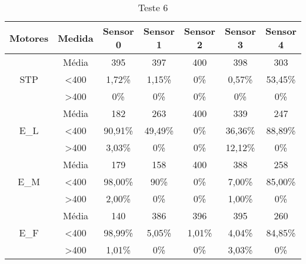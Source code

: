 \begin{table}[]
\centering
\caption{Teste 6}
\label{teste_6}
\begin{tabular}{|c|c|ccccc|}
\hline
\textbf{Motores}                & \textbf{Medida}  & \textbf{Sensor 0} & \textbf{Sensor 1} & \textbf{Sensor 2} & \textbf{Sensor 3} & \textbf{Sensor 4} \\ \hline
\multirow{3}{*}{STP}            & Média            & 395               & 397               & 400               & 398               & 303               \\
                                & \textless 400    & 1,72\%            & 1,15\%            & 0\%            & 0,57\%            & 53,45\%           \\
                                & \textgreater 400 & 0\%            & 0\%            & 0\%            & 0\%            & 0\%            \\ \hline
\multirow{3}{*}{E\_L}           & Média            & 182               & 263               & 400               & 339               & 247               \\
                                & \textless 400    & 90,91\%           & 49,49\%           & 0\%            & 36,36\%           & 88,89\%           \\
                                & \textgreater 400 & 3,03\%            & 0\%            & 0\%            & 12,12\%           & 0\%            \\ \hline
\multirow{3}{*}{E\_M}           & Média            & 179               & 158               & 400               & 388               & 258               \\
                                & \textless 400    & 98,00\%           & 90\%           & 0\%            & 7,00\%            & 85,00\%           \\
                                & \textgreater 400 & 2,00\%            & 0\%            & 0\%            & 1,00\%            & 0\%            \\ \hline
\multirow{3}{*}{E\_F}           & Média            & 140               & 386               & 396               & 395               & 260               \\
                                & \textless 400    & 98,99\%           & 5,05\%            & 1,01\%            & 4,04\%            & 84,85\%           \\
                                & \textgreater 400 & 1,01\%            & 0\%            & 0\%            & 3,03\%            & 0\%            \\ \hline

\end{tabular}
\end{table}
